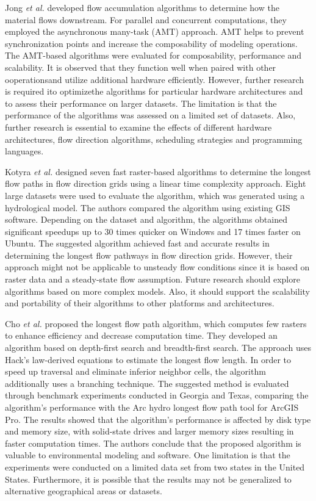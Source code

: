 \documentclass[journal, a4paper]{IEEEtran}
\begin{document}
	Jong \textit{et al.} \cite{DEJONG2022105083} developed flow accumulation algorithms to determine how the material flows downstream. For parallel and concurrent computations, they employed the asynchronous many-task (AMT) approach. AMT helps to prevent synchronization points and increase the composability of modeling operations. The AMT-based algorithms were evaluated for composability, performance and scalability. It is observed that they function well when paired with other ooperationsand utilize additional hardware efficiently. However, further research is required ito optimizethe algorithms for particular hardware architectures and to assess their performance on larger datasets. The limitation is that the performance of the algorithms was assessed on a limited set of datasets. Also, further research is essential to examine the effects of different hardware architectures, flow direction algorithms, scheduling strategies and programming languages.
	
	Kotyra \textit{et al.} \cite{KOTYRA2023105728} designed seven fast raster-based algorithms to determine the longest flow paths in flow direction grids using a linear time complexity approach. Eight large datasets were used to evaluate the algorithm, which was generated using a hydrological model. The authors compared the algorithm using existing GIS software. Depending on the dataset and algorithm, the algorithms obtained significant speedups up to 30 times quicker on Windows and 17 times faster on Ubuntu. The suggested algorithm achieved fast and accurate results in determining the longest flow pathways in flow direction grids. However, their approach might not be applicable to unsteady flow conditions since it is based on raster data and a steady-state flow assumption. Future research should explore algorithms based on more complex models. Also, it should support the scalability and portability of their algorithms to other platforms and architectures.

	Cho \textit{et al.} \cite{CHO2020104774} proposed the longest flow path algorithm, which computes few rasters to enhance efficiency and decrease computation time. They developed an algorithm based on depth-first search and breadth-first search. The approach uses Hack's law-derived equations to estimate the longest flow length. In order to speed up traversal and eliminate inferior neighbor cells, the algorithm additionally uses a branching technique. The suggested method is evaluated through benchmark experiments conducted in Georgia and Texas, comparing the algorithm's performance with the Arc hydro longest flow path tool for ArcGIS Pro. The results showed that the algorithm's performance is affected by disk type and memory size, with solid-state drives and larger memory sizes resulting in faster computation times. The authors conclude that the proposed algorithm is valuable to environmental modeling and software. One limitation is that the experiments were conducted on a limited data set from two states in the United States. Furthermore, it is possible that the results may not be generalized to alternative geographical areas or datasets.  
\end{document}
